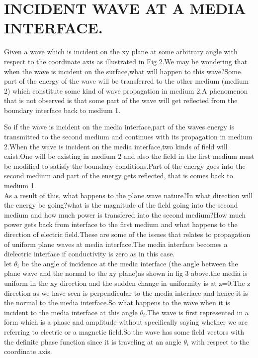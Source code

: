 \section{INCIDENT WAVE AT A MEDIA INTERFACE.}Given  a wave which is incident on the xy plane at some arbitrary angle with respect to the coordinate axis as illustrated in Fig 2.We may be wondering that when the wave is incident on the surface,what will happen to this wave?Some part of the energy of the wave will be transferred to the other medium (medium 2) which constitute some kind of wave propagation in medium 2.A phenomenon that is  not observed is that some part of the wave will get reflected  from the boundary interface back to medium 1.


So if the wave is incident on the media interface,part of the waves energy is transmitted to the second medium and continues with its propagation in medium 2.When the wave is incident on the media interface,two kinds of field will exist.One will be existing in medium 2 and also the field in the first medium must be modified to satisfy the boundary conditions.Part of the energy goes into the second medium and part of the energy gets reflected, that is comes back to medium 1.\\

As a result of this, what happens to the plane wave nature?In what direction will the energy be going?what is the magnitude of the field going into the second medium and how much power is transfered into the second medium?How much power gets back from interface to the first medium and what happens to the direction of electric field.These are some of the issues that relates to propagation of uniform plane waves at media interface.The media interface becomes a dielectric interface if conductivity is zero as in this case.\\ let $\theta_i$ be the angle of incidence at the media interface (the angle between the plane wave and the normal to the xy plane)as shown in fig 3 above.the media is uniform in the xy direction and the sudden change in uniformity is at z=0.The z direction as we have seen is perpendicular to the media interface and hence it is the normal to the media interface.So what happens to the wave when it is incident to the media interface at this angle $\theta_i$.The wave is first represented in a form which is a phase and amplitude without specifically saying whether we are referring to electric or a magnetic field.So the wave has some field vectors with the definite phase function since it is traveling at an angle $\theta_i$ with respect to the coordinate axis.	

